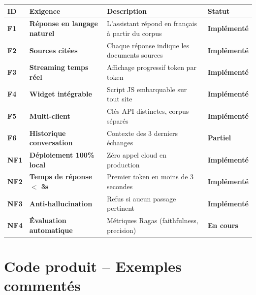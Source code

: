 \documentclass[12pt,a4paper]{report}
\begin{document}
\begin{center}
\renewcommand{\arraystretch}{1.4}
\begin{tabularx}{\linewidth}{>{\bfseries\small}p{0.6cm} >{\bfseries}p{4cm} X p{2.5cm}}
  \toprule
  \rowcolor{rowblue}
  \textbf{ID} & \textbf{Exigence} & \textbf{Description} & \textbf{Statut} \\
  \midrule
  \rowcolor{rowgreen!50}
  F1 & R\'{e}ponse en langage naturel & L'assistant r\'{e}pond en fran\c{c}ais \`{a} partir du corpus & \textcolor{successgreen}{\textbf{Impl\'{e}ment\'{e}}} \\
  \rowcolor{rowgreen!50}
  F2 & Sources cit\'{e}es & Chaque r\'{e}ponse indique les documents sources & \textcolor{successgreen}{\textbf{Impl\'{e}ment\'{e}}} \\
  \rowcolor{rowgreen!50}
  F3 & Streaming temps r\'{e}el & Affichage progressif token par token & \textcolor{successgreen}{\textbf{Impl\'{e}ment\'{e}}} \\
  \rowcolor{rowgreen!50}
  F4 & Widget int\'{e}grable & Script JS embarquable sur tout site & \textcolor{successgreen}{\textbf{Impl\'{e}ment\'{e}}} \\
  \rowcolor{rowgreen!50}
  F5 & Multi-client & Clés API distinctes, corpus s\'{e}par\'{e}s & \textcolor{successgreen}{\textbf{Impl\'{e}ment\'{e}}} \\
  \rowcolor{warnorange!20}
  F6 & Historique conversation & Contexte des 3 derniers \'{e}changes & \textcolor{warnorange}{\textbf{Partiel}} \\
  \midrule
  \rowcolor{rowgreen!50}
  NF1 & D\'{e}ploiement 100\% local & Z\'{e}ro appel cloud en production & \textcolor{successgreen}{\textbf{Impl\'{e}ment\'{e}}} \\
  \rowcolor{rowgreen!50}
  NF2 & Temps de r\'{e}ponse $<$ 3s & Premier token en moins de 3 secondes & \textcolor{successgreen}{\textbf{Impl\'{e}ment\'{e}}} \\
  \rowcolor{rowgreen!50}
  NF3 & Anti-hallucination & Refus si aucun passage pertinent & \textcolor{successgreen}{\textbf{Impl\'{e}ment\'{e}}} \\
  \rowcolor{rowred!50}
  NF4 & \'{E}valuation automatique & M\'{e}triques Ragas (faithfulness, precision) & \textcolor{alertred}{\textbf{En cours}} \\
  \bottomrule
\end{tabularx}
\end{center}

\chapter{Code produit -- Exemples comment\'{e}s}
\end{document}
